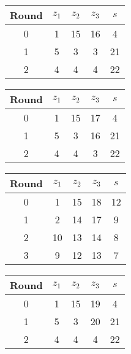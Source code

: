 \begin{multicols}{2}
\begin{tabular}{c | c | c | c | c }
Round & $z_1$ & $z_2$ & $z_3$ & $s$ \\
\hline
0 & 1 & 15 & 16 & 4 \\
1 & 5 & 3 & 3 & 21 \\
2 & 4 & 4 & 4 & 22
\end{tabular}


\begin{tabular}{c | c | c | c | c }
Round & $z_1$ & $z_2$ & $z_3$ & $s$ \\
\hline
0 & 1 & 15 & 17 & 4 \\
1 & 5 & 3 & 16 & 21 \\
2 & 4 & 4 & 3 & 22
\end{tabular}


\begin{tabular}{c | c | c | c | c }
Round & $z_1$ & $z_2$ & $z_3$ & $s$ \\
\hline
0 & 1 & 15 & 18 & 12 \\
1 & 2 & 14 & 17 & 9 \\
2 & 10 & 13 & 14 & 8 \\
3 & 9 & 12 & 13 & 7
\end{tabular}

\begin{tabular}{c | c | c | c | c }
Round & $z_1$ & $z_2$ & $z_3$ & $s$ \\
\hline
0 & 1 & 15 & 19 & 4 \\
1 & 5 & 3 & 20 & 21 \\
2 & 4 & 4 & 4 & 22
\end{tabular}
\end{multicols}
